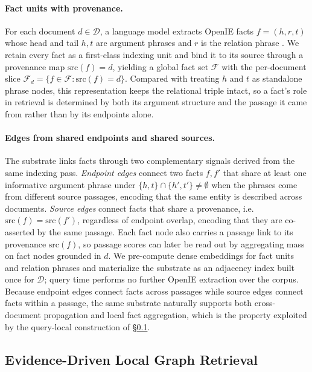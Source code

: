 \paragraph{Fact units with provenance.}
For each document $d \in \mathcal{D}$, a language model extracts
OpenIE facts $f=(h,r,t)$ whose head and tail $h, t$ are argument
phrases and $r$ is the relation phrase
\citep{angeli2015leveraging,gutierrez2025hipporag}. We retain every
fact as a first-class indexing unit and bind it to its source through
a provenance map $\mathrm{src}(f)=d$, yielding a global fact set
$\mathcal{F}$ with the per-document slice
$\mathcal{F}_d = \{f\in\mathcal{F} : \mathrm{src}(f)=d\}$. Compared
with treating $h$ and $t$ as standalone phrase nodes, this
representation keeps the relational triple intact, so a fact's role
in retrieval is determined by both its argument structure and the
passage it came from rather than by its endpoints alone.

\paragraph{Edges from shared endpoints and shared sources.}
The substrate links facts through two complementary signals derived
from the same indexing pass. \emph{Endpoint edges} connect two facts
$f, f'$ that share at least one informative argument phrase under
$\{h,t\}\cap\{h',t'\}\neq\emptyset$ when the phrases come from
different source passages, encoding that the same entity is described
across documents. \emph{Source edges} connect facts that share a
provenance, i.e.\ $\mathrm{src}(f)=\mathrm{src}(f')$, regardless of
endpoint overlap, encoding that they are co-asserted by the same
passage. Each fact node also carries a passage link to its provenance
$\mathrm{src}(f)$, so passage scores can later be read out by
aggregating mass on fact nodes grounded in $d$. We pre-compute dense
embeddings for fact units and relation phrases and materialize the
substrate as an adjacency index built once for $\mathcal{D}$; query
time performs no further OpenIE extraction over the corpus. Because
endpoint edges connect facts across passages while source edges
connect facts within a passage, the same substrate naturally supports
both cross-document propagation and local fact aggregation, which is
the property exploited by the query-local construction of
\S\ref{sec:method:retrieval}.

\subsection{Evidence-Driven Local Graph Retrieval}
\label{sec:method:retrieval}

